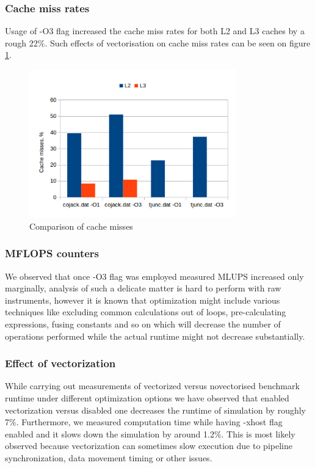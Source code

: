 \documentclass{article}
\begin{document}
\subsubsection{Cache miss rates}
Usage of -O3 flag increased the cache miss rates for both L2 and L3 caches by a rough 22\%. Such effects of vectorisation on cache miss rates can be seen on figure \ref{fig:2}.
\begin{figure}[h!]
	\begin{center}
		\includegraphics[width=0.8\textwidth]{cache-misses}
		\caption{Comparison of cache misses}
		\label{fig:2}
	\end{center}
\end{figure}

\subsubsection{MFLOPS counters}
We observed that once -O3 flag was employed measured MLUPS increased only marginally, analysis of such a delicate matter is hard to perform with raw instruments, however it is known that optimization might include various techniques like excluding common calculations out of loops, pre-calculating expressions, fusing constants and so on which will decrease the number of operations performed while the actual runtime might not decrease substantially.

\subsubsection{Effect of vectorization}
While carrying out measurements of vectorized versus novectorised benchmark runtime under different optimization options we have observed that enabled vectorization versus disabled one decreases the runtime of simulation by roughly 7\%. Furthermore, we measured computation time while having -xhost flag enabled and it slows down the simulation by around 1.2\%. This is most likely observed because vectorization can sometimes slow execution due to pipeline synchronization, data movement timing or other issues.
\end{document}
